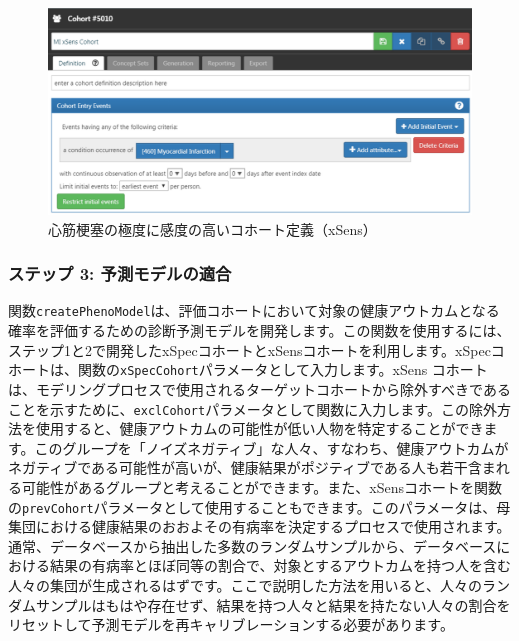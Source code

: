 \documentclass[
  11pt]{book}
\theoremstyle{definition}
\theoremstyle{definition}
\theoremstyle{definition}
\theoremstyle{definition}
\theoremstyle{remark}
\begin{document}
\begin{figure}

{\centering \includegraphics[width=1\linewidth]{images/ClinicalValidity/xSens} 

}

\caption{心筋梗塞の極度に感度の高いコホート定義（xSens）}\label{fig:xSens}
\end{figure}

\subsubsection*{ステップ 3: 予測モデルの適合}\label{ux30b9ux30c6ux30c3ux30d7-3-ux4e88ux6e2cux30e2ux30c7ux30ebux306eux9069ux5408}

関数\texttt{createPhenoModel}は、評価コホートにおいて対象の健康アウトカムとなる確率を評価するための診断予測モデルを開発します。この関数を使用するには、ステップ1と2で開発したxSpecコホートとxSensコホートを利用します。xSpecコホートは、関数の\texttt{xSpecCohort}パラメータとして入力します。xSens コホートは、モデリングプロセスで使用されるターゲットコホートから除外すべきであることを示すために、\texttt{exclCohort}パラメータとして関数に入力します。この除外方法を使用すると、健康アウトカムの可能性が低い人物を特定することができます。このグループを「ノイズネガティブ」な人々、すなわち、健康アウトカムがネガティブである可能性が高いが、健康結果がポジティブである人も若干含まれる可能性があるグループと考えることができます。また、xSensコホートを関数の\texttt{prevCohort}パラメータとして使用することもできます。このパラメータは、母集団における健康結果のおおよその有病率を決定するプロセスで使用されます。通常、データベースから抽出した多数のランダムサンプルから、データベースにおける結果の有病率とほぼ同等の割合で、対象とするアウトカムを持つ人を含む人々の集団が生成されるはずです。ここで説明した方法を用いると、人々のランダムサンプルはもはや存在せず、結果を持つ人々と結果を持たない人々の割合をリセットして予測モデルを再キャリブレーションする必要があります。
\end{document}
